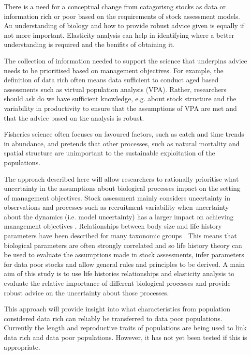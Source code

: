 \documentclass{pnastwo}
\begin{document}
\begin{article}
There is a need for a conceptual change from catagorisng stocks as data or information
rich or poor based on the requirements of stock assessment models. An understanding 
of biology and how to provide robust advice given is equally if not more important.
Elasticity analysis can help in identifying where a better understanding is required and
the benifits of obtaining it.	

The collection of information needed to support the science that underpins
advice needs to be prioritised based on management objectives. For example, the definition
of data rich often means data sufficient to conduct aged based assessments such as virtual 
population analysis (VPA). Rather, researchers should ask do we have sufficient knowledge, e.g. about stock structure
and the variability in productivity to ensure that the assumptions of VPA are met
and that the advice based on the analysis is robust.

Fisheries science often focuses on favoured factors, such as catch and time trends in
abundance, and pretends that other processes, such as natural mortality and spatial
structure are unimportant to the sustainable exploitation of the populations.

The approach described here will allow researchers to rationally prioritise what uncertainty
in the assumptions about biological processes impact on the setting of management objectives.
Stock assessment mainly considers uncertainty in observations and processes such
as recruitment variability when uncertainty about the dynamics (i.e. model uncertainty)
has a larger impact on achieving management objectives \cite{punt2008refocusing}. 
Relationships between body size and life history parameters have been described for 
many taxonomic groups 
\cite{blueweiss1978relationships}.
This means that biological parameters are often strongly correlated and so life
history theory can be used to evaluate the assumptions made in stock assessments,
infer parameters for data poor stocks and allow general rules and principles to be
derived. A main aim of this study is to use life histories relationships and elasticity
analysis to evaluate the relative importance of different biological processes and
provide robust advice on the uncertainty about those processes.

This approach will provide insight into what characteristics from population considered
data rich can reliably be transferred to data poor populations.
Currently the length and reproductive traits of populations are being used to
link data rich and data poor populations. However, it has not yet been tested if this is appropriate.


\end{article}
\end{document}
